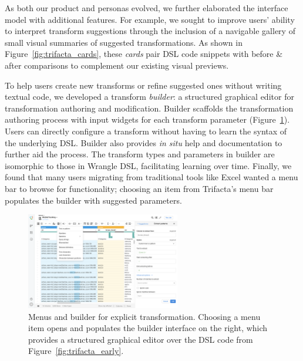 \documentclass[11pt]{article}
\begin{document}
As both our product and personas evolved, we further elaborated the interface model with additional features. For example, we sought to improve users' ability to interpret transform suggestions through the inclusion of a navigable gallery of small visual summaries of suggested transformations. As shown in Figure~\ref{fig:trifacta_cards}, these \emph{cards} pair DSL code snippets with before \& after comparisons to complement our existing visual previews.

To help users create new transforms or refine suggested ones without writing textual code, we developed a transform \emph{builder}: a structured graphical editor for transformation authoring and modification. Builder scaffolds the transformation authoring process with input widgets for each transform parameter (Figure~\ref{fig:trifacta_builder}). Users can directly configure a transform without having to learn the syntax of the underlying DSL. Builder also provides \emph{in situ} help and documentation to further aid the process. The transform types and parameters in builder are isomorphic to those in Wrangle DSL, facilitating learning over time. Finally, we found that many users migrating from traditional tools like Excel wanted a menu bar to browse for functionality; choosing an item from Trifacta's menu bar populates the builder with suggested parameters. 
\begin{figure}
       \includegraphics[width=0.6\textwidth]{figs/builder.png}
       \caption{Menus and builder for explicit transformation. Choosing a menu item opens and populates the builder interface on the right, which provides a structured graphical editor over the DSL code from Figure~\ref{fig:trifacta_early}.}
      \label{fig:trifacta_builder}
\end{figure}
\end{document}
